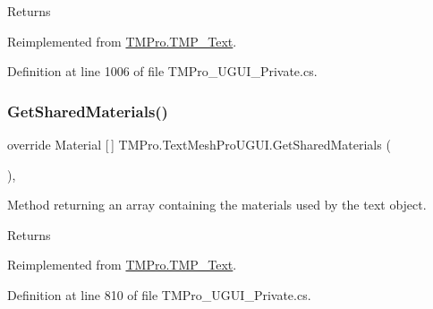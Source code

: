 \begin{DoxyReturn}{Returns}

\end{DoxyReturn}


Reimplemented from \mbox{\hyperlink{class_t_m_pro_1_1_t_m_p___text_a7182ea72ca6b396af6cae05cee59243d}{T\+M\+Pro.\+T\+M\+P\+\_\+\+Text}}.



Definition at line 1006 of file T\+M\+Pro\+\_\+\+U\+G\+U\+I\+\_\+\+Private.\+cs.

\mbox{\label{class_t_m_pro_1_1_text_mesh_pro_u_g_u_i_aba51a324293336a99b22e4ef5d380660}} 
\subsubsection{\texorpdfstring{GetSharedMaterials()}{GetSharedMaterials()}}
{\footnotesize\ttfamily override Material \mbox{[}$\,$\mbox{]} T\+M\+Pro.\+Text\+Mesh\+Pro\+U\+G\+U\+I.\+Get\+Shared\+Materials (\begin{DoxyParamCaption}{ }\end{DoxyParamCaption})\hspace{0.3cm}{\ttfamily [protected]}, {\ttfamily [virtual]}}



Method returning an array containing the materials used by the text object. 

\begin{DoxyReturn}{Returns}

\end{DoxyReturn}


Reimplemented from \mbox{\hyperlink{class_t_m_pro_1_1_t_m_p___text_a187cdc5ab36e0006fa0516f208a3cffd}{T\+M\+Pro.\+T\+M\+P\+\_\+\+Text}}.



Definition at line 810 of file T\+M\+Pro\+\_\+\+U\+G\+U\+I\+\_\+\+Private.\+cs.

\mbox{\label{class_t_m_pro_1_1_text_mesh_pro_u_g_u_i_a9061f9387fbed4095b88a7ad98a9bf90}} 
